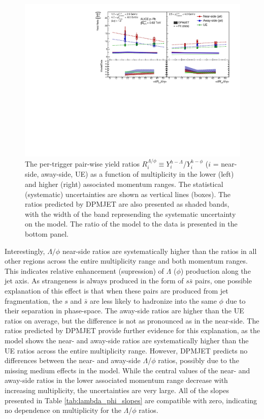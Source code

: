 \begin{figure}[ht]
\centering
\includegraphics[width=\textwidth]{figures/results/final_lambda_phi_ratio_plot_new_x_axis_model_ratio.pdf}
\caption{The per-trigger pair-wise yield ratios $R_{i}^{\Lambda/\phi} \equiv Y_{i}^{h-\Lambda}$/$Y_{i}^{h-\phi}$ ($i$ = near-side, away-side, UE) as a function of multiplicity in the lower (left) and higher (right) associated momentum ranges. The statistical (systematic) uncertainties are shown as vertical lines (boxes).  The ratios predicted by DPMJET are also presented as shaded bands, with the width of the band represending the systematic uncertainty on the model. The ratio of the model to the data is presented in the bottom panel.}
\label{fig:lambda_phi_ratio}
\end{figure}

Interestingly, $\Lambda/\phi$ near-side ratios are systematically higher than the ratios in all other regions across the entire multiplicity range and both momentum ranges. This indicates relative enhancement (supression) of $\Lambda$ ($\phi$) production along the jet axis. As strangeness is always produced in the form of $s\bar{s}$ pairs, one possible explanation of this effect is that when these pairs are produced from jet fragmentation, the $s$ and $\bar{s}$ are less likely to hadronize into the same $\phi$ due to their separation in phase-space. The away-side ratios are higher than the UE ratios on average, but the difference is not as pronounced as in the near-side.  The ratios predicted by DPMJET provide further evidence for this explanation, as the model shows the near- and away-side ratios are systematically higher than the UE ratios across the entire multiplicity range. However, DPMJET predicts no differences between the near- and away-side $\Lambda$/$\phi$ ratios, possibly due to the missing medium effects in the model. While the central values of the near- and away-side ratios in the lower associated momentum range decrease with increasing multiplicity, the uncertainties are very large. All of the slopes presented in Table \ref{tab:lambda_phi_slopes} are compatible with zero, indicating no dependence on multiplicity for the $\Lambda$/$\phi$ ratios.

